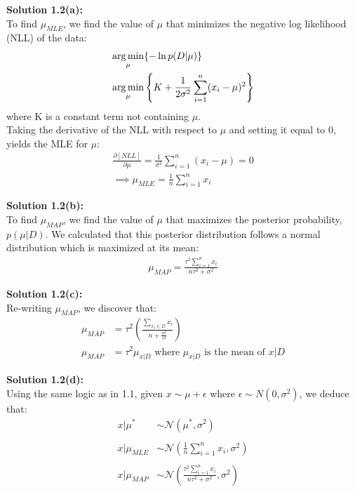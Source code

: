 \documentclass[submit]{harvardml}
\begin{document}
\noindent\textbf{Solution 1.2(a):}\\
To find $\mu_{MLE}$, we find the value of $\mu$ that minimizes the negative log likelihood (NLL) of the data:
\begin{align*}
    \argmin_{\mu}& \{- \ln p(D|\mu)\}\\
    \argmin_{\mu}& \left\{K + \frac{1}{2 \sigma^2} \sum_{i=1}^n (x_i-\mu)^2\right\}
\end{align*}
where K is a constant term not containing $\mu$.\\

Taking the derivative of the NLL with respect to $\mu$ and setting it equal to 0, yields the MLE for $\mu$:
\begin{align*}
    \frac{\partial [NLL]}{\partial \mu} = \frac{1}{\sigma^2} \sum_{i=1}^n (x_i-\mu) = 0\\
    \implies \mu_{MLE}=\frac{1}{n} \sum_{i=1}^n x_i
\end{align*}

\noindent\textbf{Solution 1.2(b):}\\
To find $\mu_{MAP}$, we find the value of $\mu$ that maximizes the posterior probability, $p(\mu | D)$. We calculated that this posterior distribution follows a normal distribution which is maximized at its mean:
\begin{align*}
    \mu_{MAP} = \frac{\tau^2 \sum_{i=1}^n x_i}{n\tau^2 + \sigma^2}
\end{align*}

\noindent\textbf{Solution 1.2(c):}\\
Re-writing $\mu_{MAP}$, we discover that:
\begin{align*}
    \mu_{MAP} &= \tau^2 \left(\frac{\sum_{x_i\in D}x_i}{n+\frac{\sigma^2}{\tau^2}}\right)\\
    \mu_{MAP} &= \tau^2 \mu_{x|D} \text{  where $\mu_{x|D}$ is the mean of $x|D$}
\end{align*}

\noindent\textbf{Solution 1.2(d):}\\
Using the same logic as in 1.1, given $x \sim \mu + \epsilon$ where $\epsilon \sim N(0,\sigma^2)$, we deduce that:
\begin{align*}
    x|\mu^* &\sim \mathcal{N}(\mu^*,\sigma^2)\\\\
    x|\mu_{MLE} &\sim \mathcal{N}\left(\frac{1}{n} \sum_{i=1}^n x_i,\sigma^2\right)\\\\
    x|\mu_{MAP} &\sim \mathcal{N}\left(\frac{\tau^2 \sum_{i=1}^n x_i}{n\tau^2 + \sigma^2},\sigma^2\right)
\end{align*}
\end{document}
